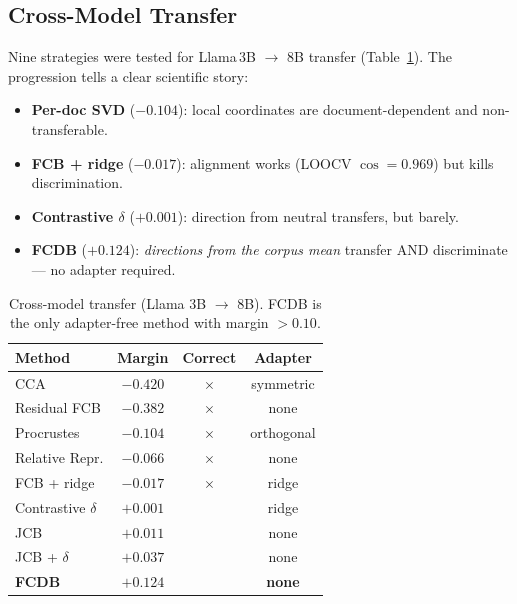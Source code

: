 \documentclass[11pt,twocolumn]{article}
\newcommand{\cmark}{\textcolor{green!60!black}{\checkmark}}
\newcommand{\xmark}{\textcolor{red!70!black}{$\times$}}
\newcommand{\fcdb}{\textsc{FCDB}}
\begin{document}
\subsection{Cross-Model Transfer}
\label{sec:cross-model}

Nine strategies were tested for Llama\,3B $\to$ 8B transfer
(Table~\ref{tab:cross-model}). The progression tells a clear scientific
story:

\begin{itemize}[leftmargin=*,itemsep=1pt]
\item \textbf{Per-doc SVD} ($-0.104$): local coordinates are
  document-dependent and non-transferable.
\item \textbf{FCB + ridge} ($-0.017$): alignment works (LOOCV
  $\cos = 0.969$) but kills discrimination.
\item \textbf{Contrastive $\delta$} ($+0.001$): direction from neutral
  transfers, but barely.
\item \textbf{\fcdb{}} ($+0.124$): \emph{directions from the corpus
  mean} transfer AND discriminate --- no adapter required.
\end{itemize}

\begin{table}[t]
\centering
\caption{Cross-model transfer (Llama 3B $\to$ 8B). \fcdb{} is the only
adapter-free method with margin $> 0.10$.}
\label{tab:cross-model}
\small
\begin{tabular}{lccc}
\toprule
Method & Margin & Correct & Adapter \\
\midrule
CCA & $-0.420$ & \xmark & symmetric \\
Residual FCB & $-0.382$ & \xmark & none \\
Procrustes & $-0.104$ & \xmark & orthogonal \\
Relative Repr. & $-0.066$ & \xmark & none \\
FCB + ridge & $-0.017$ & \xmark & ridge \\
\midrule
Contrastive $\delta$ & $+0.001$ & \cmark & ridge \\
JCB & $+0.011$ & \cmark & none \\
JCB + $\delta$ & $+0.037$ & \cmark & none \\
\rowcolor{green!10}
\textbf{\fcdb{}} & $\mathbf{+0.124}$ & \cmark & \textbf{none} \\
\bottomrule
\end{tabular}
\end{table}
\end{document}
